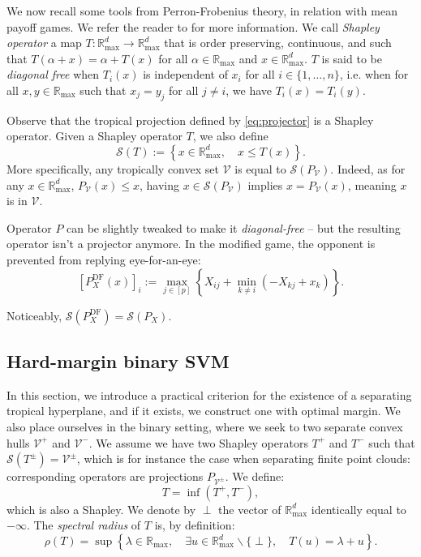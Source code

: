\documentclass[oneside,english,a4paper]{amsart}
\numberwithin{equation}{section}
\numberwithin{figure}{section}
\theoremstyle{plain}
\theoremstyle{definition}
\theoremstyle{plain}
\theoremstyle{remark}
\theoremstyle{plain}
\theoremstyle{definition}
\theoremstyle{definition}
\begin{document}
We now recall some tools from Perron-Frobenius theory, in relation
with mean payoff games. We refer the reader to \cite{AKIAN2012} for more
information. We call \emph{Shapley operator} a map $T:\mathbb{R}_{\max}^{d}\rightarrow\mathbb{R}_{\max}^{d}$
that is order preserving, continuous, and such that $T(\alpha+x)=\alpha+T(x)$
for all $\alpha\in\mathbb{R}_{\max}$ and $x\in\mathbb{R}_{\max}^{d}$. $T$ is said to be \emph{diagonal free} when $T_{i}(x)$
is independent of $x_{i}$ for all $i\in\{1,\ldots, n\}$, i.e. when for all $x,y\in\mathbb{R}_{\max}$ such that $x_{j}=y_{j}$
for all $j\neq i$, we have $T_{i}(x)=T_{i}(y)$. 

Observe that the tropical projection defined by \ref{eq:projector}
is a Shapley operator. Given a Shapley operator $T$, we also define
\[
\mathcal{S}(T):=\left\{x\in\mathbb{R}_{\max}^{d},\quad x\le T(x)\right\}.
\]
More specifically, any tropically convex set $\mathcal{V}$ is equal
to $\mathcal{S}(P_{\mathcal{V}})$. Indeed, as for any $x\in\mathbb{R}_{\text{max}}^{d}$,
$P_{\mathcal{V}}(x)\le x$, having $x\in\mathcal{S}(P_{\mathcal{V}})$
implies $x=P_{\mathcal{V}}(x)$, meaning $x$ is in
$\mathcal{V}$.


Operator $P$ can be slightly tweaked to make it \emph{diagonal-free} -- but the resulting operator isn't a projector anymore.
In the modified game, the opponent is prevented from replying eye-for-an-eye:
\[
\left[P^{\text{DF}}_X(x)\right]_{i}:=\max_{j\in[p]}\left\{ X_{ij}+\min_{k\ne i}(-X_{kj}+x_{k})\right\} .
\]

Noticeably, $\mathcal{S}(P_X^\text{DF}) = \mathcal{S}(P_X)$.

\subsection{Hard-margin binary SVM}

In this section, we introduce a practical criterion for the existence of a separating tropical hyperplane, and if it exists, we construct one with optimal margin. We also place ourselves in the binary setting, where we seek to two separate convex hulls $\mathcal{V}^{+}$
and $\mathcal{V}^{-}$. We assume we have two Shapley operators $T^{+}$
and $T^{-}$ such that $\mathcal{S}(T^{\pm})=\mathcal{V}^{\pm}$,
which is for instance the case when separating finite point clouds:
corresponding operators are projections $P_{\mathcal{V}^{\pm}}$. We define:
\[
T=\inf(T^{+},T^{-}),
\]
which is also a Shapley. We denote by $\perp$ the vector of $\mathbb{R}_{\max}^{d}$
identically equal to $-\infty$. The \emph{spectral radius} of $T$
is, by definition:
\[
\rho(T)=\sup\left\{\lambda\in\mathbb{R}_{\max},\quad\exists u\in\mathbb{R}_{\max}^{d}\backslash\{\perp\},\quad T(u)=\lambda+u\right\}.
\]
\end{document}
